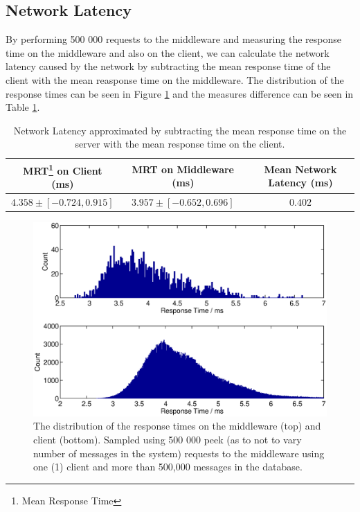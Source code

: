 \documentclass{article}
\begin{document}
        \subsection{Network Latency}
        \label{sec:network_latency}
        By performing 500 000 requests to the middleware and measuring the response time on the middleware and also on the client, we can calculate the network latency caused by the network by subtracting the mean response time of the client with the mean reasponse time on the middleware. The distribution of the response times can be seen in Figure \ref{fig:responsetime_dist_mw_and_client} and the measures difference can be seen in Table \ref{table:network_latency}.

            \begin{table}
                \begin{tabular}{|c|c|c|}
                    \hline 
                        MRT\footnote{Mean Response Time} on Client (ms) & MRT on Middleware (ms) & Mean Network Latency (ms)\\
                    \hline 
                        $4.358 \pm [-0.724, 0.915]$ & $3.957 \pm [-0.652, 0.696]$ & $0.402$ \\ 
                    \hline 
                \end{tabular} 
                \caption{Network Latency approximated by subtracting the mean response time on the server with the mean response time on the client.}
                \label{table:network_latency}
        \end{table}

        
        \begin{figure}[H]
                \centerline{\includegraphics[scale=0.50]{responsetime_dist_mw_and_client}}
                \caption{The distribution of the response times on the middleware (top) and client (bottom). Sampled using 500 000 peek (as to not to vary number of messages in the system) requests to the middleware using one (1) client and more than 500,000 messages in the database.}
                \label{fig:responsetime_dist_mw_and_client}
        \end{figure}
            
\end{document}
